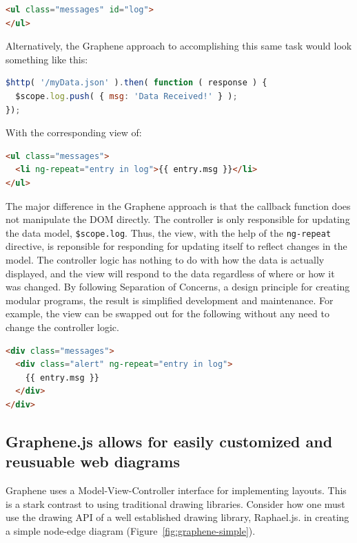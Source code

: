 \begin{lstlisting}[language=html]
<ul class="messages" id="log">
</ul>
\end{lstlisting}

Alternatively, the Graphene approach to accomplishing this same task would look something like this:

\begin{lstlisting}[language=JavaScript]
$http( '/myData.json' ).then( function ( response ) {
  $scope.log.push( { msg: 'Data Received!' } );
});
\end{lstlisting}

With the corresponding view of:

\begin{lstlisting}[language=html]
<ul class="messages">
  <li ng-repeat="entry in log">{{ entry.msg }}</li>
</ul>
\end{lstlisting}

The major difference in the Graphene approach is that the callback function does not manipulate the DOM directly.
The controller is only responsible for updating the data model, \texttt{\$scope.log}.
Thus, the view, with the help of the \texttt{ng-repeat} directive, is reponsible for responding for updating itself to reflect changes in the model.
The controller logic has nothing to do with how the data is actually displayed, and the view will respond to the data regardless of where or how it was changed.
By following Separation of Concerns, a design principle for creating modular programs, the result is simplified development and maintenance.
For example, the view can be swapped out for the following without any need to change the controller logic.

\begin{lstlisting}[language=html]
<div class="messages">
  <div class="alert" ng-repeat="entry in log">
    {{ entry.msg }}
  </div>
</div>
\end{lstlisting}


\subsection{Graphene.js allows for easily customized and reusuable web diagrams}

Graphene uses a Model-View-Controller \autocite{krasner1988description} interface for implementing layouts.
This is a stark contrast to using traditional drawing libraries.
Consider how one must use the drawing API of a well established drawing library, Raphael.js. \autocite{sencha2014raphael} in creating a simple node-edge diagram (Figure~\ref{fig:graphene-simple}).

